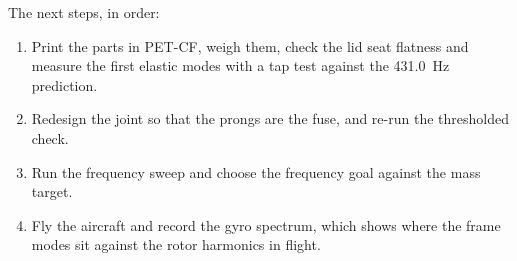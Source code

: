 The next steps, in order:
\begin{enumerate}
\item Print the parts in PET-CF, weigh them, check the lid seat flatness and measure the first elastic modes with a tap test against the \SI{431.0}{Hz} prediction.
\item Redesign the joint so that the prongs are the fuse, and re-run the thresholded check.
\item Run the frequency sweep and choose the frequency goal against the mass target.
\item Fly the aircraft and record the gyro spectrum, which shows where the frame modes sit against the rotor harmonics in flight.
\end{enumerate}
